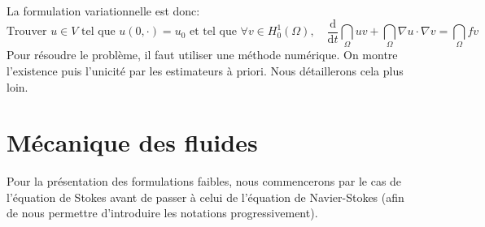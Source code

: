 \medskip
La formulation variationnelle est donc:
\begin{equation}
\text{Trouver } u\in V \text{ tel que } u(0,\cdot)=u_0 \text{ et tel que } \forall v\in H^1_0(\Omega),\quad
\dfrac{\mathrm d}{\mathrm dt}\dint_\Omega uv+\dint_\Omega \nabla u\cdot\nabla v=\dint_\Omega fv
\end{equation}
\medskip
Pour résoudre le problème, il faut utiliser une méthode numérique. On montre l'existence puis l'unicité par les estimateurs à priori.
Nous détaillerons cela plus loin.

\medskip
\section{Mécanique des fluides}
Pour la présentation des formulations faibles, nous commencerons par le cas de
l'équation de Stokes avant de passer à celui de l'équation de Navier-Stokes (afin
de nous permettre d'introduire les notations progressivement).


\medskip
